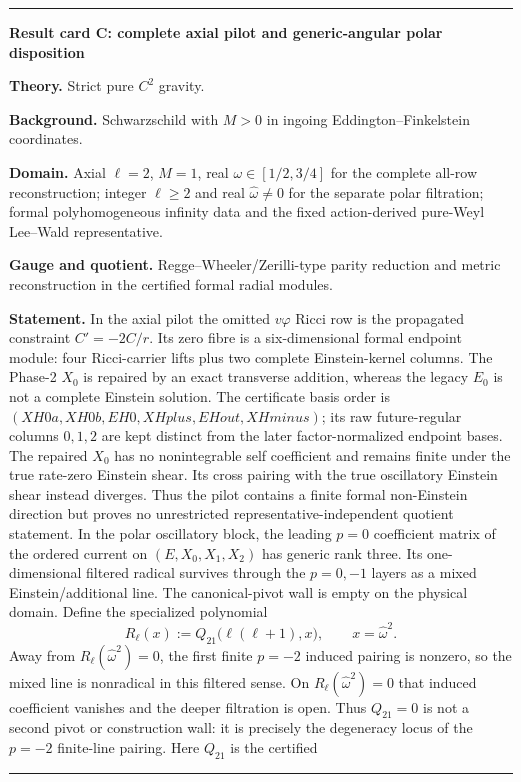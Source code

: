 \documentclass[11pt]{article}
\newenvironment{resultcard}[1]
 {\par\medskip\noindent\hrule\smallskip\noindent\textbf{#1}\par\smallskip}
 {\par\smallskip\hrule\medskip}
\begin{document}
\begin{resultcard}{Result card C: complete axial pilot and generic-angular polar disposition}
\textbf{Theory.} Strict pure $C^2$ gravity.\par
\textbf{Background.} Schwarzschild with $M>0$ in ingoing
Eddington--Finkelstein coordinates.\par
\textbf{Domain.} Axial $\ell=2$, $M=1$, real
$\omega\in[1/2,3/4]$ for the complete all-row reconstruction; integer
$\ell\ge2$ and real $\widehat\omega\ne0$ for the separate polar filtration;
formal polyhomogeneous infinity data and the fixed action-derived pure-Weyl
Lee--Wald representative.\par
\textbf{Gauge and quotient.} Regge--Wheeler/Zerilli-type parity reduction and
metric reconstruction in the certified formal radial modules.\par
\textbf{Statement.} In the axial pilot the omitted $v\varphi$ Ricci row is
the propagated constraint $C'=-2C/r$.  Its zero fibre is a six-dimensional
formal endpoint module: four Ricci-carrier lifts plus two complete
Einstein-kernel columns.  The Phase-2 $X_0$ is repaired by an exact transverse
addition, whereas the legacy $E_0$ is not a complete Einstein solution.  The
certificate basis order is \((XH0a,XH0b,EH0,XHplus,EHout,XHminus)\); its
raw future-regular columns \(0,1,2\) are kept distinct from the later
factor-normalized endpoint bases.  The
repaired $X_0$ has no nonintegrable self coefficient and remains finite under
the true rate-zero Einstein shear.  Its cross pairing with the true
oscillatory Einstein shear instead diverges.  Thus the pilot contains a
finite formal non-Einstein direction but proves no unrestricted
representative-independent quotient statement.  In the polar oscillatory block, the
leading $p=0$ coefficient matrix of the ordered current on
$(E,X_0,X_1,X_2)$ has generic rank three.  Its one-dimensional filtered
radical survives through the $p=0,-1$ layers as a mixed
Einstein/additional line.  The canonical-pivot wall is empty on the physical
domain.  Define the specialized polynomial
\[
 R_\ell(x):=Q_{21}\bigl(\ell(\ell+1),x\bigr),
 \qquad x=\widehat\omega^2.
\]
Away from $R_\ell(\widehat\omega^2)=0$, the first finite $p=-2$ induced
pairing is nonzero, so the mixed line is nonradical in this filtered sense.
On $R_\ell(\widehat\omega^2)=0$ that induced coefficient vanishes and the
deeper filtration is open.  Thus $Q_{21}=0$ is not a second pivot or
construction wall: it is precisely the degeneracy locus of the $p=-2$
finite-line pairing.  Here $Q_{21}$ is the certified

\end{resultcard}
\end{document}
